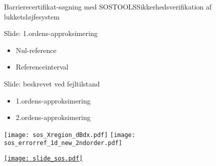 \begin{frame}{Barrierecertifikat-søgning med SOSTOOLS}{Sikkerhedsverifikation af lukketsløjfesystem}
\begin{minipage}[b]{0.65\linewidth}
	\vspace{2mm}
\begin{block}{Slide: 1.ordens-approksimering}
		\begin{itemize}
			\item Nul-reference
			\item Referenceinterval
		\end{itemize}
\end{block}
\begin{block}{Slide: beskrevet ved fejltilstand}
	\begin{itemize}
		\item 1.ordens-approksimering
		\item 2.ordens-approksimering
	\end{itemize}
\end{block}
\hspace{3mm}
	\texttt{[image: sos\_Xregion\_dBdx.pdf]}
\hspace{3mm}
\texttt{[image: sos\_errorref\_1d\_new\_2ndorder.pdf]}
\end{minipage}
\hspace{1mm}
\begin{minipage}[b]{0.32\linewidth}
\href{file:../../MATLAB/test_barriersearch.m}{\texttt{[image: slide\_sos.pdf]}}	
\end{minipage}
\end{frame}

